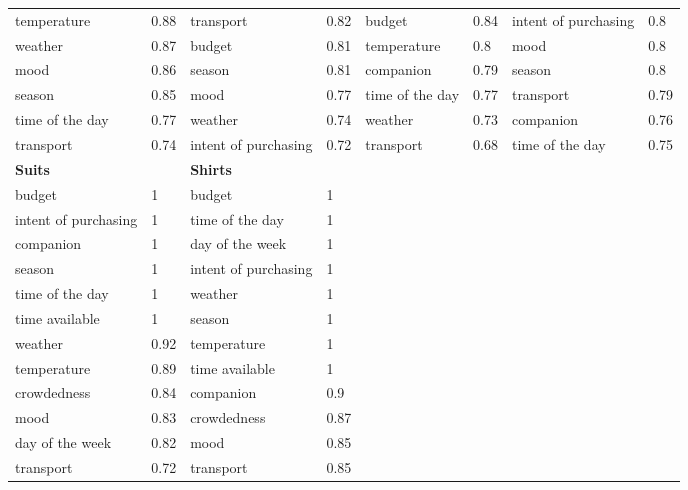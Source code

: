 \begin{center}
\begin{longtable}{p{2.2cm}p{0.5cm}p{2.2cm}p{0.5cm}p{2.2cm}p{0.5cm}p{2.3cm}p{0.5cm}}
temperature & 0.88 & transport & 0.82 & budget & 0.84 & intent of purchasing & 0.8 \\
weather & 0.87 & budget & 0.81 & temperature & 0.8 & mood & 0.8 \\
mood & 0.86 & season & 0.81 & companion & 0.79 & season & 0.8 \\
season & 0.85 & mood & 0.77 & time of the day & 0.77 & transport & 0.79 \\
time of the day & 0.77 & weather & 0.74 & weather & 0.73 & companion & 0.76 \\
transport & 0.74 & intent of purchasing & 0.72 & transport & 0.68 & time of the day & 0.75 \\
\hline
\textbf{Suits} &  & \textbf{Shirts} \\
\hline
budget & 1 & budget & 1 \\
intent of purchasing & 1 & time of the day & 1 \\
companion & 1 & day of the week & 1 \\
season & 1 & intent of purchasing & 1 \\
time of the day & 1 & weather & 1 \\
time available & 1 & season & 1 \\
weather & 0.92 & temperature & 1 \\
temperature & 0.89 & time available & 1 \\
crowdedness & 0.84 & companion & 0.9 \\
mood & 0.83 & crowdedness & 0.87 \\
day of the week & 0.82 & mood & 0.85 \\
transport & 0.72 & transport & 0.85 \\
\end{longtable}
\end{center}
